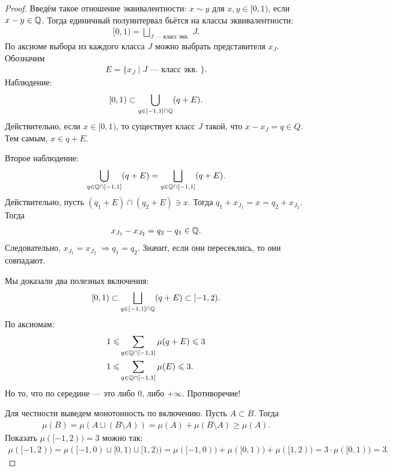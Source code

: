 \documentclass[a4paper,14pt]{extarticle}
\theoremstyle{definition}
\theoremstyle{plain}
\theoremstyle{plain}
\theoremstyle{plain}
\theoremstyle{plain}
\theoremstyle{definition}
\theoremstyle{definition}
\theoremstyle{definition}
\theoremstyle{definition}
\theoremstyle{definition}
\theoremstyle{definition}
\theoremstyle{plain}
\theoremstyle{plain}
\theoremstyle{plain}
\theoremstyle{plain}
\theoremstyle{definition}
\theoremstyle{definition}
\theoremstyle{definition}
\theoremstyle{definition}
\theoremstyle{definition}
\newcommand{\Q}{\ensuremath \mathbb{Q}}
\begin{document}
\begin{proof}
 Введём такое отношение эквивалентности: $ x \sim y $ для $ x,y \in [0, 1) $, если $ x-y \in \Q $. Тогда единичный полуинтервал бьётся на классы эквивалентности:
 \begin{align*}
  [0, 1) = \bigsqcup_{J \text{ --- класс экв. }} J
 .\end{align*} По аксиоме выбора из каждого класса $ J $ можно выбрать представителя $ x_J $. Обозначим
 \begin{align*}
  E = \{ x_J \mid J \text { --- класс экв. } \}
 .\end{align*} Наблюдение:
 \begin{align*}
  [0, 1) \subset \bigcup_{q \in [-1, 1] \cap \Q} (q + E)
 .\end{align*} Действительно, если $ x \in [0, 1) $, то существует класс $ J $ такой, что $ x - x_J = q \in Q $. Тем самым, $ x \in q + E $.

 Второе наблюдение:
 \begin{align*}
  \bigcup_{q \in \Q \cap [-1, 1]} (q + E) = \bigsqcup_{q \in \Q \cap [-1, 1]} (q + E)
 .\end{align*} Действительно, пусть $ (q_1 + E) \cap (q_2 + E) \ni x $. Тогда $ q_1 + x_{J_1} = x = q_2 + x_{J_2} $. Тогда
 \begin{align*}
  x_{J_1} - x_{J_2} = q_2 - q_1 \in \Q
 .\end{align*} Следовательно, $ x_{J_1} = x_{J_2} \;\Longrightarrow q_1 = q_2$. Значит, если они пересеклись, то они совпадают.

 Мы доказали два полезных включения:
 \begin{align*}
  [0, 1) \subset \bigsqcup_{q \in [-1, 1] \cap \Q} (q + E) \subset [-1, 2)
 .\end{align*} По аксиомам:
 \begin{align*}
  1 \leqslant & \sum_{q \in \Q \cap [-1, 1]} \mu(q + E) \leqslant 3 \\
  1 \leqslant & \sum_{q \in \Q \cap [-1, 1]} \mu(E) \leqslant 3
 .\end{align*} Но то, что по середине --- это либо $ 0 $, либо $ +\infty $. Противоречие!

 Для честности выведем монотонность по включению. Пусть $ A \subset B $. Тогда
 \begin{align*}
  \mu(B) = \mu(A \sqcup (B \setminus A)) = \mu(A) + \mu(B \setminus A) \geqslant \mu(A)
 .\end{align*} Показать $ \mu([-1, 2)) = 3 $ можно так:
 \begin{align*}
  \mu([-1, 2)) = \mu([-1, 0) \sqcup [0, 1) \sqcup [1, 2)) =\mu([-1, 0)) + \mu([0, 1)) + \mu([1, 2)) = 3 \cdot \mu([0, 1)) = 3
 .\end{align*}
\end{proof}
\end{document}
